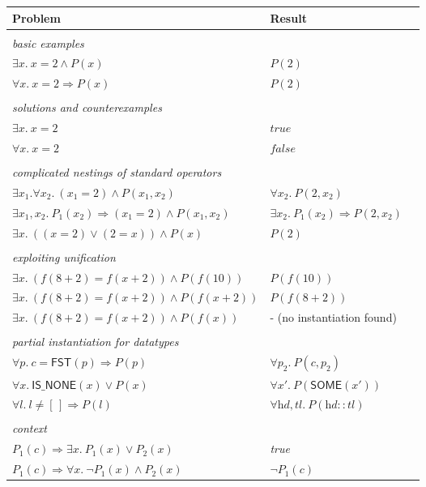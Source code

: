 \newcommand{\mytablehead}[1]{\\\multicolumn{2}{l}{\textit{#1}}\\}
\begin{table}[h]
\centering %
\begin{tabular}{lll}
\textbf{Problem} & \textbf{Result} \\\hline

\mytablehead{basic examples}
$\exists x.\ x = 2 \wedge P (x)$ & $P(2)$ \\
$\forall x.\ x = 2 \Longrightarrow P (x)$ & $P(2)$ \\

\mytablehead{solutions and counterexamples}
$\exists x.\ x = 2$ & $\textit{true}$ \\
$\forall x.\ x = 2$ & $\textit{false}$ \\

\mytablehead{complicated nestings of standard operators}
$\exists x_1. \forall x_2.\ (x_1 = 2) \wedge P(x_1, x_2)$ &
$\forall x_2.\ P(2, x_2)$ \\

$\exists x_1, x_2.\ P_1(x_2) \Longrightarrow (x_1 = 2) \wedge P(x_1, x_2)$ &
$\exists x_2.\ P_1(x_2) \Longrightarrow P(2, x_2)$ \\
$\exists x.\ ((x = 2) \vee (2 = x)) \wedge P(x)$ & $P(2)$ \\

\mytablehead{exploiting unification}
$\exists x.\ (f (8 + 2) = f (x + 2)) \wedge P (f(10))$ & $P (f(10))$ \\
$\exists x.\ (f (8 + 2) = f (x + 2)) \wedge P (f(x + 2))$ & $P (f(8 + 2))$ \\
$\exists x.\ (f (8 + 2) = f (x + 2)) \wedge P (f(x))$ & - (\textrm{no instantiation found}) \\

\mytablehead{partial instantiation for datatypes}
$\forall p.\ c = \textsf{FST}(p) \Longrightarrow P(p)$ & $\forall p_2.\ P(c, p_2)$ \\

$\forall x.\ \textsf{IS\_NONE}(x) \vee P(x)$ & $\forall x'.\ P (\textsf{SOME}(x'))$ \\

$\forall l.\ l \neq [\,] \Longrightarrow P(l)$ & $\forall \textit{hd}, \textit{tl}.\
P(\textit{hd} :: \textit{tl})$ \\

\mytablehead{context}
$P_1(c) \Longrightarrow \exists x.\ P_1(x) \vee P_2(x)$ & \textit{true} \\
$P_1(c) \Longrightarrow \forall x.\ \neg P_1(x) \wedge P_2(x)$ & $\neg P_1(c)$ \\


\end{tabular}
\end{table}
